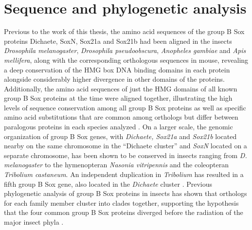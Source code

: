 \section{Sequence and phylogenetic analysis}
Previous to the work of this thesis, the amino acid sequences of the group B Sox proteins Dichaete, SoxN, Sox21a and Sox21b had been aligned in the insects \emph{Drosophila melanogaster}, \emph{Drosophila pseudoobscura}, \emph{Anopheles gambiae} and \emph{Apis mellifera}, along with the corresponding orthologous sequences in mouse, revealing a deep conservation of the HMG box DNA binding domains in each protein alongside considerably higher divergence in other domains of the proteins. Additionally, the amino acid sequences of just the HMG domains of all known group B Sox proteins at the time were aligned together, illustrating the high levels of sequence conservation among all group B Sox proteins as well as specific amino acid substitutions that are common among orthologs but differ between paralogous proteins in each species analyzed \citep{mckimmie_conserved_2005}. On a larger scale, the genomic organization of group B Sox genes, with \emph{Dichaete, Sox21a} and \emph{Sox21b} located nearby on the same chromosome in the “Dichaete cluster” and \emph{SoxN} located on a separate chromosome, has been shown to be conserved in insects ranging from \emph{D. melanogaster} to the hymenopteran \emph{Nasonia vitripennis} and the coleopteran \emph{Tribolium castaneum}. An independent duplication in \emph{Tribolium} has resulted in a fifth group B Sox gene, also located in the \emph{Dichaete} cluster \citep{phochanukul_no_2010}. Previous phylogenetic analysis of group B Sox proteins in insects has shown that orthologs for each family member cluster into clades together, supporting the hypothesis that the four common group B Sox proteins diverged before the radiation of the major insect phyla \citep{wilson_evolution_2008,zhong_parallel_2011}.\\


